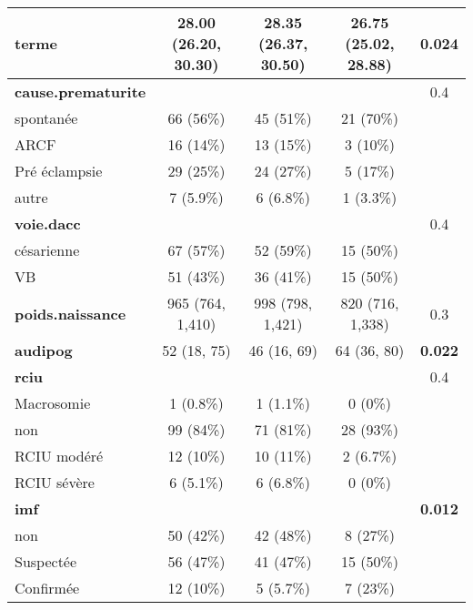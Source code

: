 \documentclass[
  10pt,
  a4paper,
]{scrartcl}
\begin{document}
\begin{table}
\begin{tabular}[t]{l|c|c|c|c}
\hline
\textbf{terme} & 28.00 (26.20, 30.30) & 28.35 (26.37, 30.50) & 26.75 (25.02, 28.88) & \textbf{0.024}\\
\hline
\textbf{cause.prematurite} &  &  &  & 0.4\\
\hline
\hspace{1em}spontanée & 66 (56\%) & 45 (51\%) & 21 (70\%) & \\
\hline
\hspace{1em}ARCF & 16 (14\%) & 13 (15\%) & 3 (10\%) & \\
\hline
\hspace{1em}Pré éclampsie & 29 (25\%) & 24 (27\%) & 5 (17\%) & \\
\hline
\hspace{1em}autre & 7 (5.9\%) & 6 (6.8\%) & 1 (3.3\%) & \\
\hline
\textbf{voie.dacc} &  &  &  & 0.4\\
\hline
\hspace{1em}césarienne & 67 (57\%) & 52 (59\%) & 15 (50\%) & \\
\hline
\hspace{1em}VB & 51 (43\%) & 36 (41\%) & 15 (50\%) & \\
\hline
\textbf{poids.naissance} & 965 (764, 1,410) & 998 (798, 1,421) & 820 (716, 1,338) & 0.3\\
\hline
\textbf{audipog} & 52 (18, 75) & 46 (16, 69) & 64 (36, 80) & \textbf{0.022}\\
\hline
\textbf{rciu} &  &  &  & 0.4\\
\hline
\hspace{1em}Macrosomie & 1 (0.8\%) & 1 (1.1\%) & 0 (0\%) & \\
\hline
\hspace{1em}non & 99 (84\%) & 71 (81\%) & 28 (93\%) & \\
\hline
\hspace{1em}RCIU modéré & 12 (10\%) & 10 (11\%) & 2 (6.7\%) & \\
\hline
\hspace{1em}RCIU sévère & 6 (5.1\%) & 6 (6.8\%) & 0 (0\%) & \\
\hline
\textbf{imf} &  &  &  & \textbf{0.012}\\
\hline
\hspace{1em}non & 50 (42\%) & 42 (48\%) & 8 (27\%) & \\
\hline
\hspace{1em}Suspectée & 56 (47\%) & 41 (47\%) & 15 (50\%) & \\
\hline
\hspace{1em}Confirmée & 12 (10\%) & 5 (5.7\%) & 7 (23\%) & \\

\end{tabular}
\end{table}
\end{document}
